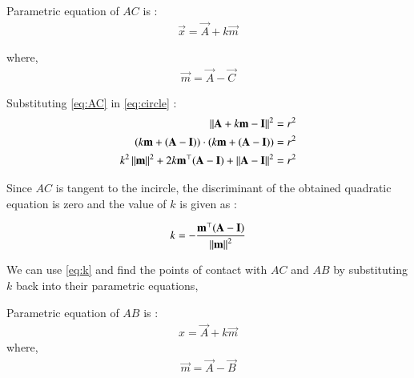 \documentclass[journal,12pt,twocolumn]{IEEEtran}
\theoremstyle{remark}
\begin{document}
Parametric equation of $AC$ is :
\begin{align}
	\vec{x} = \vec{A} + k\vec{m} \label{eq:AC}
\end{align}

where,
\begin{align}
	\vec{m} = \vec{A} - \vec{C}
\end{align}
	
Substituting \eqref{eq:AC} in \eqref{eq:circle} : 
\begin{align}
	{\left\lVert \mathbf{A}+k\mathbf{m}-\mathbf{I} \right\rVert}^2 &= {r}^2 \\
	(k\mathbf{m} + (\mathbf{A} - \mathbf{I}))\cdot(k\mathbf{m} + (\mathbf{A} - \mathbf{I})) &= {r}^2 \\
	k^2 \left\lVert\mathbf{m}\right\rVert^2 + 2k\mathbf{m}^{\top} (\mathbf{A}-\mathbf{I}) + \left\lVert\mathbf{A}-\mathbf{I}\right\rVert^2 &= {r}^2
\end{align}

Since $AC$ is tangent to the incircle, the discriminant of the obtained quadratic equation is zero and the value of $k$ is given as :

\begin{align}
	k = -\frac{\mathbf{m}^{\top}(\mathbf{A} - \mathbf{I})}{\left\lVert\mathbf{m}\right\rVert^2} \label{eq:k}
\end{align}

We can use \eqref{eq:k} and find the points of contact with $AC$ and $AB$ by substituting $k$ back into their parametric equations,  
	
Parametric equation of $AB$ is : 
\begin{align}
	x = \vec{A} + k\vec{m} \label{eq:AB}
\end{align}
where,
\begin{align}
	\vec{m} = \vec{A} - \vec{B}
\end{align}
\end{document}
